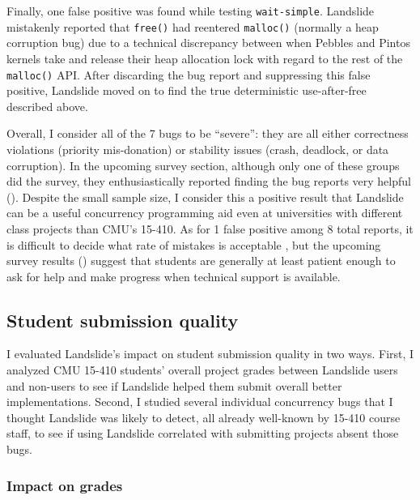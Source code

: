 Finally, one false positive was found while testing {\tt wait-simple}.
Landslide mistakenly reported that {\tt free()} had reentered {\tt malloc()}
(normally a heap corruption bug)
due to a technical discrepancy between when Pebbles and Pintos kernels take and release their heap allocation lock
with regard to the rest of the {\tt malloc()} API.
After discarding the bug report and suppressing this false positive,
Landslide moved on to find the true deterministic use-after-free described above.

Overall, I consider all of the 7 bugs to be ``severe'':
they are all either correctness violations (priority mis-donation)
or stability issues (crash, deadlock, or data corruption).
In the upcoming survey section, although only one of these groups did the survey,
they enthusiastically reported finding the bug reports very helpful (\sect{\ref{sec:education-survey-response-data}}).
Despite the small sample size, I consider this
a positive result that Landslide can be a useful concurrency programming aid
even at universities with different class projects than CMU's 15-410.
As for 1 false positive among 8 total reports,
it is difficult to decide what rate of mistakes is acceptable \cite{racerx},
but the upcoming survey results (\sect{\ref{sec:education-eval-survey-falsepositives}})
suggest that students are generally at least patient enough
to ask for help and make progress when technical support is available.

\subsection{Student submission quality}
\label{sec:education-eval-grades}

I evaluated Landslide's impact on student submission quality in two ways.
First, I analyzed CMU 15-410 students' overall project grades between Landslide users and non-users
to see if Landslide helped them submit overall better implementations.
Second, I studied
several %
individual concurrency bugs that I thought Landslide was likely to detect,
all already well-known by 15-410 course staff,
to see if using Landslide correlated with submitting projects absent those bugs.

\subsubsection{Impact on grades}

